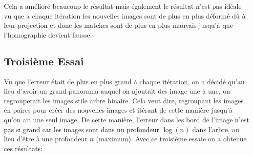 \documentclass[11pt]{article}
\begin{document}
Cela a amélioré beaucoup le résultat mais également le résultat n’est pas idéale vu que a chaque itération les nouvelles images sont de plus en plus déformé dû à leur projection et donc les matches sont de plus en plus mauvais jusqu’à que l’homographie devient fausse.

\subsection{Troisième Essai}

Vu que l’erreur était de plus en plus grand à chaque itération, on a décidé qu’au lieu d’avoir un grand panorama auquel on ajoutait des image une à une, on regrouperait les images stile arbre binaire. Cela veut dire, regroupant les images en paires pour créer des nouvelles images et itérant de cette manière jusqu’à qu’on ait une seul image.  De cette manière, l’erreur dans les bord de l’image n’est pas si grand car les images sont dans un profondeur $\log(n)$ dans l’arbre, au lieu d’être à une profondeur $n$ (maximum).
Avec ce troisième essaie on a obtenue ces résultats:
\end{document}
